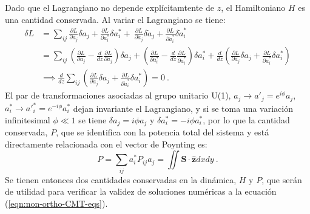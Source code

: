 Dado que el Lagrangiano no depende explícitamtente de $z$, el Hamiltoniano $H$ es una cantidad conservada. Al variar el Lagrangiano se tiene:
\begin{align*}
	\delta L &= \sum_{ij} \frac{\partial L}{\partial a_j} \delta a_{j} +  \frac{\partial L}{\partial {a}_{i}^*} \delta {a}_{i}^* + \ \frac{\partial L}{\partial \dot{a}_{j}} \delta \dot{a}_{j} + \frac{\partial L}{\partial \dot{{a}}_{i}^*} \delta \dot{{a}}_{i}^*
	\\
	&= \sum_{ij} \left( \frac{\partial L}{\partial a_{j}} - \frac{d}{dz}\frac{\partial L}{\partial \dot{a}_{j}} \right)\delta a_{j} + \left( \frac{\partial L}{\partial {a}_{i}^*} - \frac{d}{dz}\frac{\partial L}{\partial  \dot{{a}}_{i}^*} \right)\delta {a}_{i}^* + \frac{d}{dz}\left(\frac{\partial L}{\partial \dot{a}_{j}}\delta a_{j} +  \frac{\partial L}{\partial \dot{{a}}^*_{i}}\delta {a}_{i}^*\right)
	\\	
	&\implies  \frac{d}{dz} \sum_{ij}\left(\frac{\partial L}{\partial \dot{a}_{j}}\delta a_{j} +  \frac{\partial L}{\partial \dot{{a}}_{i}^*}\delta {a}_{i}^*\right) = 0 \ .
\end{align*}
El par de transformaciones asociadas al grupo unitario U(1), $a_j\to a'_j = e^{i\phi}a_j$, ${a}_i^* \to {a'}_i^* = e^{-i\phi}{a}_i^*$ dejan invariante el Lagrangiano, y si se toma una variación infinitesimal $\phi \ll 1$ se tiene $\delta a_j = i\phi a_j$ y $\delta {a}_i^* = -i\phi {a}_i^*$, por lo que la cantidad conservada, $P$, que se identifica con la potencia total del sistema y está directamente relacionada con el vector de Poynting es:
\begin{equation}
	P = \sum_{ij} a_i^* P_{ij} a_j = \iint \textbf{S} \cdot \hat{\textbf{z}} dxdy \ .  \label{eqn:power}
\end{equation}
Se tienen entonces dos cantidades conservadas en la dinámica, $H$ y $P$, que serán de utilidad para verificar la validez de soluciones numéricas a la ecuación (\ref{eqn:non-ortho-CMT-eqs}).

